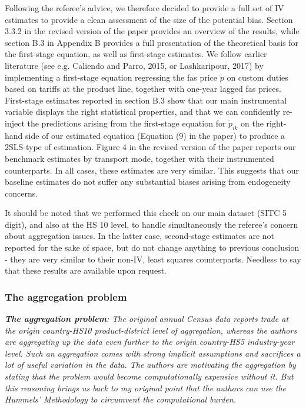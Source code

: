 \documentclass[a4paper,11pt]{article}
\begin{document}
Following the referee's advice, we therefore decided to provide a full set of IV estimates to provide a clean assessment of the size of the potential bias. Section 3.3.2 in the revised version of the paper provides an overview of the results, while section B.3 in Appendix B provides a full presentation of the theoretical basis for the first-stage equation, as well as first-stage estimates. We follow earlier literature (see e.g. Caliendo and Parro, 2015, or Lashkaripour, 2017) by implementing a first-stage equation regressing the fas price $\widetilde{p}$ on custom duties based on tariffs at the product line, together with one-year lagged fas prices. First-stage estimates reported in section B.3 show that our main instrumental variable displays the right statistical properties, and that we can confidently re-inject the predictions arising from the first-stage equation for $\widetilde{p}_{ik}$ on the right-hand side of our estimated equation (Equation (9) in the paper) to produce a 2SLS-type of estimation. Figure 4 in the revised version of the paper reports our benchmark estimates by transport mode, together with their instrumented counterparts. In all cases, these estimates are very similar. This suggests that our baseline estimates do not suffer any substantial biases arising from endogeneity concerns.

It should be noted that we performed this check on our main dataset (SITC 5 digit), and also at the HS 10 level, to handle simultaneously the referee's concern about aggregation issues. In the latter case, second-stage estimates are not reported for the sake of space, but do not change anything to previous conclusion - they are very similar to their non-IV, least squares counterparts. Needless to say that these results are available upon request.


\subsubsection{The aggregation problem}

\textit{\textbf{The aggregation problem}: The original annual Census data reports
trade at the origin country-HS10 product-district level of aggregation,
whereas the authors are aggregating up the data even further to the origin
country-HS5 industry-year level. Such an aggregation comes with strong implicit assumptions and sacrifices a lot of useful variation in the data.
The authors are motivating the aggregation by stating that the problem
would become computationally expensive without it. But this reasoning
brings us back to my original point that the authors can use the Hummels'
Methodology to circumvent the computational burden.}
\end{document}
